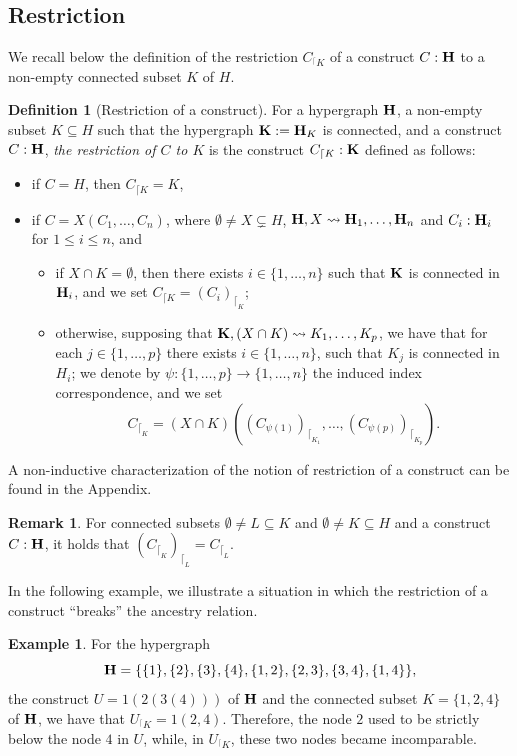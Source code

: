 \documentclass{article}
\theoremstyle{plain}
\theoremstyle{definition}
\newtheorem{definition}[thm]{Definition}
\newtheorem{remark}[thm]{Remark}
\newtheorem{example}[thm]{\sc Example}
\newcommand{\inter}{\cap}
\newcommand{\hyper}[1]{{\bf #1}}
\newcommand{\restrconstr}[2]{{#1}_{{}^\lceil {#2}}}
\begin{document}
\subsection{Restriction} \label{restriction-subsection}
We recall below the definition of the restriction $\restrconstr{C}{K}$ of a construct  $C:{\bf H}$ to a non-empty connected subset $K$ of $H$.
 \begin{definition}[Restriction of a construct] \label{restriction-definition}
For a hypergraph ${\bf H}$, a non-empty subset $K\subseteq H$ such that the hypergraph ${\bf K}:={\bf H}_K$ is connected, and a construct $C:{\bf H}$,   \emph{the restriction of $C$ to $K$} is  the construct $C_{\lceil K}:{\bf K}$ defined as follows:
\begin{itemize}
\item if $C=H$, then $C_{\lceil K}=K$, 
\item if $C=X(C_1,\dots,C_n)$, where $\emptyset \neq X \subsetneq H$, ${\bf H},X\leadsto {\bf H}_1,\dots ,{\bf H}_n$ and $C_{i}:{\bf H}_{i}$ for $1\leq i\leq n$, and  
\begin{itemize}
\item if $X\inter K=\emptyset$, then there exists  $i\in\{1,\dots,n\}$ such that ${\bf K}$ is connected in ${\bf H}_i$, and we set   $C_{\lceil K}={(C_{i})}_{\lceil_{K}}$;
\item otherwise,  supposing that ${\bf K},(X\inter K)\leadsto K_1,\dots,K_p$, we have that  for each $j\in\{1,\dots,p\}$  there exists  $i\in\{1,\dots,n\}$, such that $K_j$ is connected in $H_i$; we denote by $\psi:\{1,\dots,p\}\rightarrow \{1,\dots,n\}$  the induced index correspondence, and we set $$C_{\lceil_{K}}=(X\inter K)((C_{\psi(1)})_{\lceil_{K_1}},\dots,(C_{\psi(p)})_{\lceil_{K_p}}).$$
\end{itemize}
\end{itemize}
\end{definition}
A non-inductive characterization of the notion of restriction   of a construct  can be found in the Appendix. 
\begin{remark}\label{rest1}
For connected subsets $\emptyset \neq L\subseteq K$ and $\emptyset\neq K\subseteq H$  and a construct $C:{\bf H}$,  it holds that ${(C_{\lceil_K})}_{\lceil_L}=C_{\lceil_L}$.
\end{remark}
 


In the following example, we illustrate a situation in which the restriction of a construct ``breaks'' the ancestry relation.  
\begin{example}
For the hypergraph $${\hyper{H}}=\{\{1\},\{2\},\{3\},\{4\},\{1,2\},\{2,3\},\{3,4\},\{1,4\}\},$$ the construct $U=1(2(3(4)))$ of ${\bf H}$ and the connected subset $K=\{1,2,4\}$ of ${\bf H}$, we have that $\restrconstr{U}{K}=1(2,4)$. Therefore, the node  $2$ used to be strictly below the node  $4$ in $U$, while, in $\restrconstr{U}{K}$, these two nodes became incomparable. 
\end{example}
\end{document}
